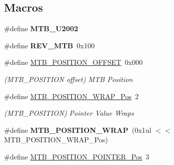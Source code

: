 \subsection*{Macros}
\begin{DoxyCompactItemize}
\item 
\hypertarget{group___s_a_m_l21___m_t_b_ga2d1f0c359b5a3e5564403203a61ad9f0}{}\#define {\bfseries M\+T\+B\+\_\+\+U2002}\label{group___s_a_m_l21___m_t_b_ga2d1f0c359b5a3e5564403203a61ad9f0}

\item 
\hypertarget{group___s_a_m_l21___m_t_b_ga596b20f15d56213a44961489dfefafd0}{}\#define {\bfseries R\+E\+V\+\_\+\+M\+T\+B}~0x100\label{group___s_a_m_l21___m_t_b_ga596b20f15d56213a44961489dfefafd0}

\item 
\hypertarget{group___s_a_m_l21___m_t_b_gacf736a2cfd54247fce8d341e4083bc65}{}\#define \hyperlink{group___s_a_m_l21___m_t_b_gacf736a2cfd54247fce8d341e4083bc65}{M\+T\+B\+\_\+\+P\+O\+S\+I\+T\+I\+O\+N\+\_\+\+O\+F\+F\+S\+E\+T}~0x000\label{group___s_a_m_l21___m_t_b_gacf736a2cfd54247fce8d341e4083bc65}

\begin{DoxyCompactList}\small\item\em (M\+T\+B\+\_\+\+P\+O\+S\+I\+T\+I\+O\+N offset) M\+T\+B Position \end{DoxyCompactList}\item 
\hypertarget{group___s_a_m_l21___m_t_b_gae36946e901f21af399790c801131a24d}{}\#define \hyperlink{group___s_a_m_l21___m_t_b_gae36946e901f21af399790c801131a24d}{M\+T\+B\+\_\+\+P\+O\+S\+I\+T\+I\+O\+N\+\_\+\+W\+R\+A\+P\+\_\+\+Pos}~2\label{group___s_a_m_l21___m_t_b_gae36946e901f21af399790c801131a24d}

\begin{DoxyCompactList}\small\item\em (M\+T\+B\+\_\+\+P\+O\+S\+I\+T\+I\+O\+N) Pointer Value Wraps \end{DoxyCompactList}\item 
\hypertarget{group___s_a_m_l21___m_t_b_ga3d831001edb7b1b2b965fa994a62ae42}{}\#define {\bfseries M\+T\+B\+\_\+\+P\+O\+S\+I\+T\+I\+O\+N\+\_\+\+W\+R\+A\+P}~(0x1ul $<$$<$ M\+T\+B\+\_\+\+P\+O\+S\+I\+T\+I\+O\+N\+\_\+\+W\+R\+A\+P\+\_\+\+Pos)\label{group___s_a_m_l21___m_t_b_ga3d831001edb7b1b2b965fa994a62ae42}

\item 
\hypertarget{group___s_a_m_l21___m_t_b_gaa28512e5fb745a251e5d1d36942f62ea}{}\#define \hyperlink{group___s_a_m_l21___m_t_b_gaa28512e5fb745a251e5d1d36942f62ea}{M\+T\+B\+\_\+\+P\+O\+S\+I\+T\+I\+O\+N\+\_\+\+P\+O\+I\+N\+T\+E\+R\+\_\+\+Pos}~3\label{group___s_a_m_l21___m_t_b_gaa28512e5fb745a251e5d1d36942f62ea}


\end{DoxyCompactItemize}
